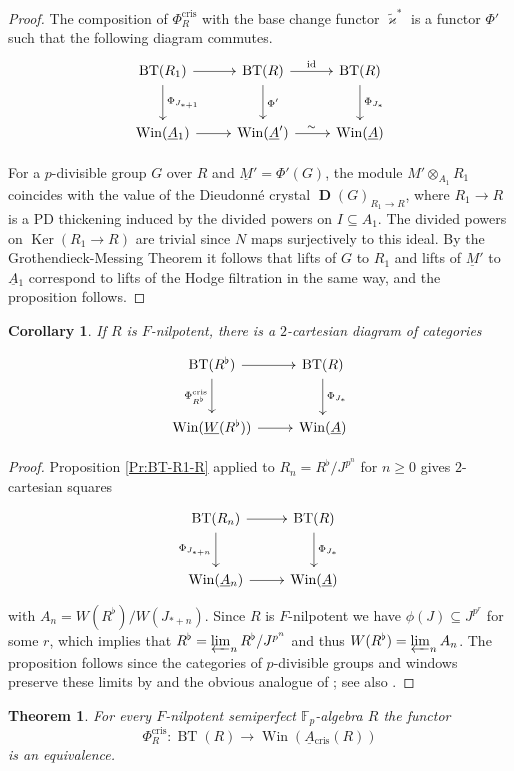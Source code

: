 \documentclass[a4paper,11pt]{article}
\theoremstyle{plain}
\newtheorem{Thm}[Lemma]{Theorem}
\newtheorem{Cor}[Lemma]{Corollary}
\theoremstyle{definition}
\theoremstyle{remark}
\theoremstyle{definition}
\numberwithin{Lemma}{section}
\numberwithin{Subpoint}{Lemma}
\numberwithin{equation}{section}
\newcommand{\DD}{{\mathbb{D}}}
\newcommand{\FF}{{\mathbb{F}}}
\DeclareMathOperator{\BT}{BT}
\DeclareMathOperator{\Dfun}{\mathbf D} %
\DeclareMathOperator{\Ker}{Ker}
\DeclareMathOperator{\Win}{Win}
\DeclareMathOperator{\cris}{cris}
\DeclareMathOperator{\id}{id}
\renewcommand{\u}{\underline}
\newcommand{\chang}[1]{{#1}}
\begin{document}
\begin{proof}
The composition of $\Phi_R^{\cris}$ with the
base change functor $\tilde\varkappa^*$
is a functor $\Phi'$ such that the following diagram commutes.
\[
\xymatrix@M+0.2em{
\BT(R_1) \ar[r] \ar[d]^{\Phi_{J_{*+1}}} & 
\BT(R) \ar[r]^{\id} \ar[d]^{\Phi'} &
\BT(R) \ar[d]^{\Phi_{J_{*}}} \\
\Win(\u A{}_1) \ar[r] &
\Win(\u A') \ar[r]^\sim &
\Win(\u A)
}
\]

For a $p$-divisible group $G$ over $R$ and 
$\u M'=\Phi'(G)$, the module $M'\otimes_{A_1}R_1$
coincides with the value of the Dieudonn\'e crystal $\Dfun(G)_{R_1\to R}$,
where $R_1\to R$ is a PD thickening induced by the divided powers
on $I\subseteq A_1$.
The divided powers on $\Ker(R_1\to R)$ are trivial since
$N$ maps surjectively to this ideal.
By the Grothendieck-Messing Theorem
it follows that lifts of $G$ to $R_1$ and lifts of $\u M'$ to
$\u A{}_1$ correspond to lifts of the Hodge filtration in the same way,
and the proposition follows.
\end{proof}

\begin{Cor}
\label{Co:BT-Rflat-R}
If $R$ is $F$-nilpotent, 
there is a $2$-cartesian diagram of categories
\[
\xymatrix@M+0.2em{
\BT(R^\flat) \ar[r] \ar[d]_{\Phi^{\cris}_{R^\flat}} & 
\BT(R) \ar[d]^{\Phi_{J_{*}}} \\ 
\Win(\u W(R^\flat)) \ar[r] &
\Win(\u A)
}
\] 
\end{Cor}

\begin{proof}
Proposition \ref{Pr:BT-R1-R} applied to
$R_n=R^\flat/J^{p^n}$ for $n\ge 0$ gives $2$-cartesian squares
\[
\xymatrix@M+0.2em{
\BT(R_n) \ar[r] \ar[d]_{\Phi_{J_{*+n}}} & 
\BT(R) \ar[d]^{\Phi_{J_{*}}} \\ 
\Win(\u A{}_n) \ar[r] &
\Win(\u A)
}
\] 
with $A_n=W(R^\flat)/W(J_{*+n})$.
Since $R$ is $F$-nilpotent we have $\phi(J)\subseteq J^{p^r}$ for
some $r$, which implies that $R^\flat=\varprojlim_n R^\flat/J^{p^n}$
and thus $W(R^\flat)=\varprojlim_n A_n$.
The proposition follows since
the categories of $p$-divisible groups and windows 
preserve these limits 
by \cite[Lemma~2.12]{Lau:Frames} and the obvious analogue of
\cite[II Lemma~4.16]{Messing:Crystals}; 
see also \cite[Lemma~2.4.4]{Jong:Crystalline}.
\end{proof}

\begin{Thm}
\label{Th:semiperfect-Fnil}
For \chang{every} $F$-nilpotent semiperfect $\FF_p$-algebra $R$ the functor
\[
\Phi_R^{\cris}:\BT(R)\to\Win(\u A{}_{\cris}(R))
\]
is an equivalence.
\end{Thm}
\end{document}
